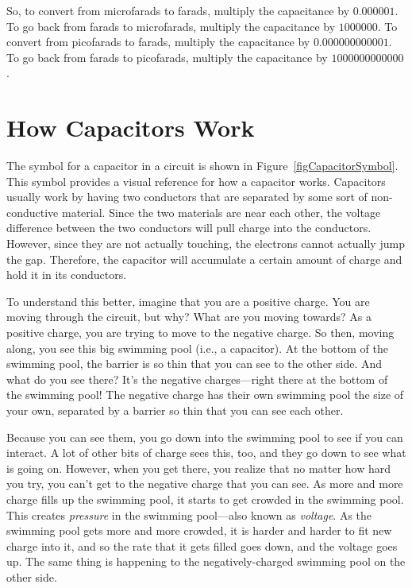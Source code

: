 So, to convert from microfarads to farads, multiply the capacitance by $0.000001$.
To go back from farads to microfarads, multiply the capacitance by $1000000$.
To convert from picofarads to farads, multiply the capacitance by $0.000000000001$.
To go back from farads to picofarads, multiply the capacitance by $1000000000000$.

\section{How Capacitors Work}


The symbol for a capacitor in a circuit is shown in Figure~\ref{figCapacitorSymbol}.
This symbol provides a visual reference for how a capacitor works.
Capacitors usually work by having two conductors that are separated by some sort of non-conductive material.
Since the two materials are near each other, the voltage difference between the two conductors will pull charge into the conductors.  
However, since they are not actually touching, the electrons cannot actually jump the gap.
Therefore, the capacitor will accumulate a certain amount of charge and hold it in its conductors.

To understand this better, imagine that you are a positive charge.
You are moving through the circuit, but why?  What are you moving towards?
As a positive charge, you are trying to move to the negative charge.
So then, moving along, you see this big swimming pool (i.e., a capacitor).
At the bottom of the swimming pool, the barrier is so thin that you can see to the other side.
And what do you see there?  
It's the negative charges---right there at the bottom of the swimming pool!
The negative charge has their own swimming pool the size of your own, separated by a barrier so thin that you can see each other.

Because you can see them, you go down into the swimming pool to see if you can interact.
A lot of other bits of charge sees this, too, and they go down to see what is going on.
However, when you get there, you realize that no matter how hard you try, you can't get to the negative charge that you can see.
As more and more charge fills up the swimming pool, it starts to get crowded in the swimming pool.
This creates \emph{pressure} in the swimming pool---also known as \emph{voltage}.
As the swimming pool gets more and more crowded, it is harder and harder to fit new charge into it, and so the rate that it gets filled goes down, and the voltage goes up.
The same thing is happening to the negatively-charged swimming pool on the other side.

